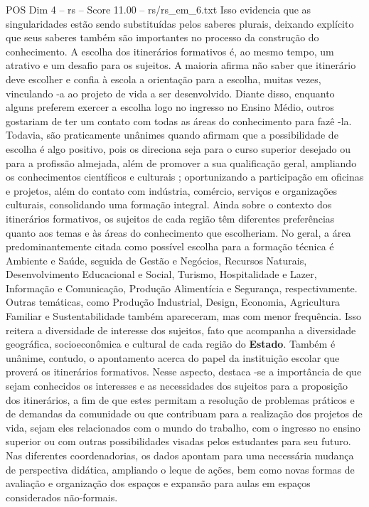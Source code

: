 \begin{textsample}{POS Dim 4 – rs – Score 11.00 – rs/rs\_em\_6.txt}
Isso evidencia que as singularidades estão sendo substituídas pelos saberes plurais, deixando explícito que seus saberes também são importantes no processo da construção do conhecimento.
A escolha dos itinerários formativos é, ao mesmo tempo, um atrativo e um desafio para os sujeitos.
A maioria afirma não saber que itinerário deve escolher e confia à escola a orientação para a escolha, muitas vezes, vinculando -a ao projeto de vida a ser desenvolvido.
Diante disso, enquanto alguns preferem exercer a escolha logo no ingresso no Ensino Médio, outros gostariam de ter um contato com todas as áreas do conhecimento para fazê -la.
Todavia, são praticamente unânimes quando afirmam que a possibilidade de escolha é algo positivo, pois os direciona seja para o curso superior desejado ou para a profissão almejada, além de promover a sua qualificação geral, ampliando os conhecimentos científicos e culturais ; oportunizando a participação em oficinas e projetos, além do contato com indústria, comércio, serviços e organizações culturais, consolidando uma formação integral.
Ainda sobre o contexto dos itinerários formativos, os sujeitos de cada região têm diferentes preferências quanto aos temas e às áreas do conhecimento que escolheriam.
No geral, a área predominantemente citada como possível escolha para a formação técnica é Ambiente e Saúde, seguida de Gestão e Negócios, Recursos Naturais, Desenvolvimento Educacional e Social, Turismo, Hospitalidade e Lazer, Informação e Comunicação, Produção Alimentícia e Segurança, respectivamente.
Outras temáticas, como Produção Industrial, Design, Economia, Agricultura Familiar e Sustentabilidade também apareceram, mas com menor frequência.
Isso reitera a diversidade de interesse dos sujeitos, fato que acompanha a diversidade geográfica, socioeconômica e cultural de cada região do \textbf{Estado}.
Também é unânime, contudo, o apontamento acerca do papel da instituição escolar que proverá os itinerários formativos.
Nesse aspecto, destaca -se a importância de que sejam conhecidos os interesses e as necessidades dos sujeitos para a proposição dos itinerários, a fim de que estes permitam a resolução de problemas práticos e de demandas da comunidade ou que contribuam para a realização dos projetos de vida, sejam eles relacionados com o mundo do trabalho, com o ingresso no ensino superior ou com outras possibilidades visadas pelos estudantes para seu futuro.
Nas diferentes coordenadorias, os dados apontam para uma necessária mudança de perspectiva didática, ampliando o leque de ações, bem como novas formas de avaliação e organização dos espaços e expansão para aulas em espaços considerados não-formais.

\end{textsample}
